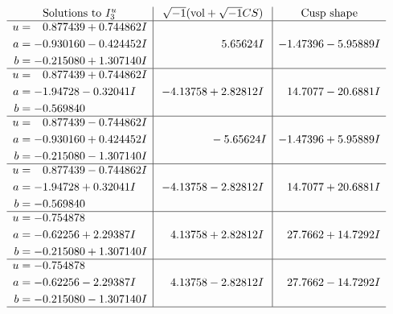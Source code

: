 \documentclass[1p]{elsarticle_modified}
\theoremstyle{definition}
\newcommand{\I}{\sqrt{-1}}
\begin{document}
$$\begin{array}{c|c|c}  
\text{Solutions to }I^u_{3}& \I (\text{vol} + \sqrt{-1}CS) & \text{Cusp shape}\\
 \hline 
\begin{aligned}
u &= \phantom{-}0.877439 + 0.744862 I \\
a &= -0.930160 - 0.424452 I \\
b &= -0.215080 + 1.307140 I\end{aligned}
 & \phantom{-0.000000 -}5.65624 I & -1.47396 - 5.95889 I \\ \hline\begin{aligned}
u &= \phantom{-}0.877439 + 0.744862 I \\
a &= -1.94728 - 0.32041 I \\
b &= -0.569840\phantom{ +0.000000I}\end{aligned}
 & -4.13758 + 2.82812 I & \phantom{-}14.7077 - 20.6881 I \\ \hline\begin{aligned}
u &= \phantom{-}0.877439 - 0.744862 I \\
a &= -0.930160 + 0.424452 I \\
b &= -0.215080 - 1.307140 I\end{aligned}
 & \phantom{-0.000000 } -5.65624 I & -1.47396 + 5.95889 I \\ \hline\begin{aligned}
u &= \phantom{-}0.877439 - 0.744862 I \\
a &= -1.94728 + 0.32041 I \\
b &= -0.569840\phantom{ +0.000000I}\end{aligned}
 & -4.13758 - 2.82812 I & \phantom{-}14.7077 + 20.6881 I \\ \hline\begin{aligned}
u &= -0.754878\phantom{ +0.000000I} \\
a &= -0.62256 + 2.29387 I \\
b &= -0.215080 + 1.307140 I\end{aligned}
 & \phantom{-}4.13758 + 2.82812 I & \phantom{-}27.7662 + 14.7292 I \\ \hline\begin{aligned}
u &= -0.754878\phantom{ +0.000000I} \\
a &= -0.62256 - 2.29387 I \\
b &= -0.215080 - 1.307140 I\end{aligned}
 & \phantom{-}4.13758 - 2.82812 I & \phantom{-}27.7662 - 14.7292 I\\
 \hline 
 \end{array}$$\newpage\newpage\renewcommand{\arraystretch}{1}
\end{document}

